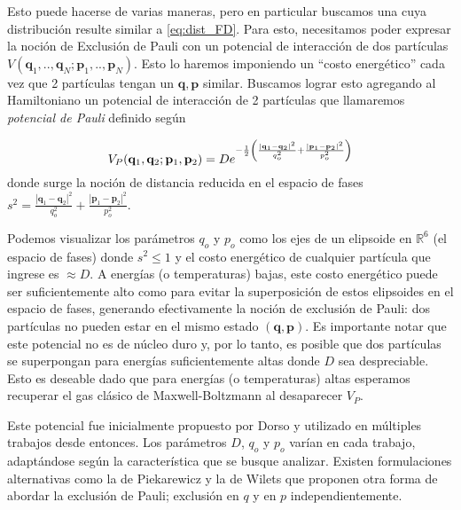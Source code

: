 Esto puede hacerse de varias maneras, pero en particular buscamos una cuya distribución resulte similar a \eqref{eq:dist_FD}.
Para esto, necesitamos poder expresar la noción de Exclusión de Pauli con un potencial de interacción de dos partículas $V(\mathbf{q}_1,..,\mathbf{q}_N;\mathbf{p}_1,..,\mathbf{p}_N)$.
Esto lo haremos imponiendo un ``costo energético'' cada vez que 2 partículas tengan un $\mathbf{q}, \mathbf{p}$ similar.
Buscamos lograr esto agregando al Hamiltoniano un potencial de interacción de 2 partículas que llamaremos \textit{potencial de Pauli} definido según

\begin{equation}{\label{eq:def_int_pauli}}
 V_P(\mathbf{q}_1,\mathbf{q}_2;\mathbf{p}_1,\mathbf{p}_2) = De^{-\frac{1}{2}\left( \frac{|\mathbf{q}_1-\mathbf{q}_2|^2}{q_o^2} +\frac{|\mathbf{p}_1-\mathbf{p}_2|^2}{p_o^2} \right)}
\end{equation}
donde surge la noción de distancia reducida en el espacio de fases $s^2 = \frac{|\mathbf{q}_1-\mathbf{q}_2|^2}{q_o^2} +\frac{|\mathbf{p}_1-\mathbf{p}_2|^2}{p_o^2}$.

Podemos visualizar los parámetros $q_o$ y $p_o$ como los ejes de un elipsoide en $\mathbb{R}^6$ (el espacio de fases) donde $s^2 \leq 1$ y el costo energético de cualquier partícula
que ingrese es $\approx D$.
A energías (o temperaturas) bajas, este costo energético puede ser suficientemente alto como para evitar la superposición de estos elipsoides en el espacio de fases, generando efectivamente
la noción de exclusión de Pauli: dos partículas no pueden estar en el mismo estado $(\mathbf{q}, \mathbf{p})$.
Es importante notar que este potencial no es de núcleo duro y, por lo tanto, es posible que dos partículas se superpongan para energías suficientemente altas donde $D$ sea despreciable.
Esto es deseable dado que para energías (o temperaturas) altas esperamos recuperar el gas clásico de Maxwell-Boltzmann al desaparecer $V_P$.

Este potencial fue inicialmente propuesto por Dorso \cite{Dorso1987, Dorso1988, Dorso1993} y utilizado en múltiples trabajos desde entonces\cite{Maruyama2012, Taruna2008}.
Los parámetros $D$, $q_o$ y $p_o$ varían en cada trabajo, adaptándose según la característica que se busque analizar.
Existen formulaciones alternativas como la de Piekarewicz \cite{Taruna2008} y la de Wilets \cite{Wilets1977} que proponen otra forma de abordar la exclusión de Pauli; exclusión en $q$ y en $p$ independientemente.

